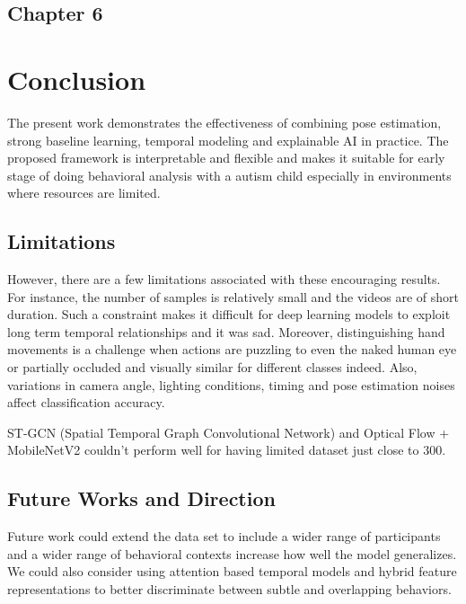 
\begin{center}
    \section*{\fontsize{20}{20}\selectfont Chapter 6}
\end{center}
\vspace{10mm}

\section{Conclusion}


The present work demonstrates the effectiveness of combining pose estimation, strong baseline learning, temporal modeling and explainable AI in practice. The proposed framework is interpretable and flexible and makes it suitable for early stage of doing behavioral analysis with a autism child especially in environments where resources are limited.

\subsection{Limitations}

However, there are a few limitations associated with these encouraging results. For instance, the number of samples is relatively small and the videos are of short duration. Such a constraint makes it difficult for deep learning models to exploit long term temporal relationships and it was sad. Moreover, distinguishing hand movements is a challenge when actions are puzzling to even the naked human eye or partially occluded and visually similar for different classes indeed. Also, variations in camera angle, lighting conditions, timing and pose estimation noises affect classification accuracy.

ST-GCN (Spatial Temporal Graph Convolutional Network) and Optical Flow + MobileNetV2 couldn't perform well for having limited dataset just close to 300.

\subsection{Future Works and Direction}

Future work could extend the data set to include a wider range of participants and a wider range of behavioral contexts increase how well the model generalizes. We could also consider using attention based temporal models and hybrid feature representations to better discriminate between subtle and overlapping behaviors.

